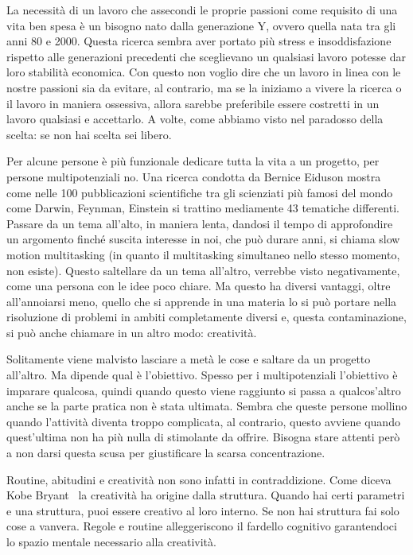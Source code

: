 \documentclass[12pt]{book} %
\begin{document}
\begin{mdframed}[linewidth=1pt]
La necessità di un lavoro che assecondi le proprie passioni come requisito di una vita ben spesa è un bisogno nato dalla
generazione Y, ovvero quella nata tra gli anni 80 e 2000. Questa ricerca sembra aver portato più stress e
insoddisfazione rispetto alle generazioni precedenti che sceglievano un qualsiasi lavoro potesse dar loro stabilità
economica. Con questo non voglio dire che un lavoro in linea con le nostre passioni sia da evitare, al contrario, ma se
la iniziamo a vivere la ricerca o il lavoro in maniera ossessiva, allora sarebbe preferibile essere costretti in un
lavoro qualsiasi e accettarlo. A volte, come abbiamo visto nel paradosso della scelta: se non hai scelta sei libero.

Per alcune persone è più funzionale dedicare tutta la vita a un progetto, per persone multipotenziali no. Una ricerca
condotta da Bernice Eiduson mostra come nelle 100 pubblicazioni scientifiche tra gli scienziati più famosi del mondo
come Darwin, Feynman, Einstein si trattino mediamente 43 tematiche differenti. Passare da un tema
all'alto, in maniera lenta, dandosi il tempo di approfondire un argomento finché suscita interesse
in noi, che può durare anni, si chiama slow motion multitasking (in quanto il multitasking simultaneo nello stesso
momento, non esiste). Questo saltellare da un tema all'altro, verrebbe visto negativamente, come
una persona con le idee poco chiare. Ma questo ha diversi vantaggi, oltre all'annoiarsi meno,
quello che si apprende in una materia lo si può portare nella risoluzione di problemi in ambiti completamente diversi
e, questa contaminazione, si può anche chiamare in un altro modo:
creatività.

Solitamente viene malvisto lasciare a metà le cose e saltare da un progetto all'altro. Ma dipende
qual è l'obiettivo. Spesso per i multipotenziali l'obiettivo è imparare
qualcosa, quindi quando questo viene raggiunto si passa a qualcos'altro anche se la parte pratica
non è stata ultimata. Sembra che queste persone mollino quando l'attività diventa troppo
complicata, al contrario, questo avviene quando quest'ultima non ha più nulla di stimolante da
offrire. Bisogna stare attenti però a non darsi questa scusa per giustificare la scarsa concentrazione.

Routine, abitudini e creatività non sono infatti in contraddizione. Come diceva Kobe Bryant \ la creatività ha origine
dalla struttura. Quando hai certi parametri e una struttura, puoi essere creativo al loro interno. Se non hai struttura
fai solo cose a vanvera. Regole e routine alleggeriscono il fardello cognitivo garantendoci lo spazio mentale
necessario alla creatività.


\end{mdframed}
\end{document}
